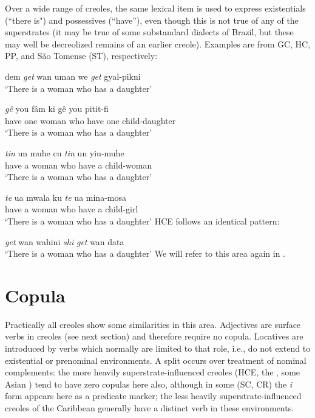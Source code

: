 Over a wide range of creoles, the same lexical item is used to express existentials (``there is") and possessives (``have''), even though this is not true of any of the superstrates (it may be true of some substandard  dialects of Brazil, but these may well be decreolized remains of an earlier creole). Examples are from GC, HC, PP, and S\~ao Tomense (ST), respectively:

\ea\label{ex:2:55}
 dem \textit{get} wan uman we \textit{get} gyal-pikni \\
\glt `There is a woman who has a daughter'
\z

\ea\label{ex:2:56}
\gll \emph{gê} you f{\^a}m ki gê you pitit-fi\\
have one woman who have one child-daughter\\
\glt `There is a woman who has a daughter'
\z

\ea\label{ex:2:57}
\gll \emph{tin} un muhe cu \emph{tin} un yiu-muhe\\
have a woman who have a child-woman \\
\glt `There is a woman who has a daughter'
\z

\ea\label{ex:2:58}
 \gll \emph{te} ua mwala ku \emph{te} ua mina-mosa \\
have a woman who have a child-girl\\
\glt `There is a woman who has a daughter'
\z
HCE follows an identical pattern:

\ea\label{ex:2:59}
 \textit{get} wan wahini \textit{shi} \textit{get} wan data\\
\glt `There is a woman who has a daughter' 
\z
We will refer to this area again in .

\section{Copula}

Practically all creoles show some similarities in this area. Adjec\-tives are surface verbs in creoles (see next section) and therefore require no copula. Locatives are introduced by verbs which normally are limited to that role, i.e., do not extend to existential or prenominal environments. A split occurs over treatment of nominal complements: the more heavily superstrate-influenced creoles (HCE, the , some Asian ) tend to have zero copulas here also, although in some (SC, CR) the \textit{i} form appears here as a predicate marker; the less heavily superstrate-influenced creoles of the Caribbean generally have a distinct verb in these environments.


